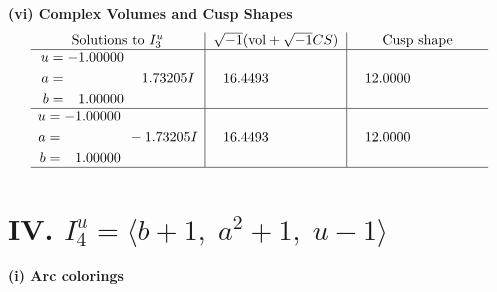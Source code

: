 \documentclass[1p]{elsarticle_modified}
\theoremstyle{definition}
\newcommand{\I}{\sqrt{-1}}
\begin{document}
\newpage\flushleft \textbf{(vi) Complex Volumes and Cusp Shapes}
$$\begin{array}{c|c|c}  
\text{Solutions to }I^u_{3}& \I (\text{vol} + \sqrt{-1}CS) & \text{Cusp shape}\\
 \hline 
\begin{aligned}
u &= -1.00000\phantom{ +0.000000I} \\
a &= \phantom{-0.000000 -}1.73205 I \\
b &= \phantom{-}1.00000\phantom{ +0.000000I}\end{aligned}
 & \phantom{-}16.4493\phantom{ +0.000000I} & \phantom{-}12.0000\phantom{ +0.000000I} \\ \hline\begin{aligned}
u &= -1.00000\phantom{ +0.000000I} \\
a &= \phantom{-0.000000 } -1.73205 I \\
b &= \phantom{-}1.00000\phantom{ +0.000000I}\end{aligned}
 & \phantom{-}16.4493\phantom{ +0.000000I} & \phantom{-}12.0000\phantom{ +0.000000I}\\
 \hline 
 \end{array}$$\newpage\newpage\renewcommand{\arraystretch}{1}
\centering \section*{IV. $I^u_{4}= \langle b+1,\;a^2+1,\;u-1 \rangle$}
\flushleft \textbf{(i) Arc colorings}\\
\end{document}
